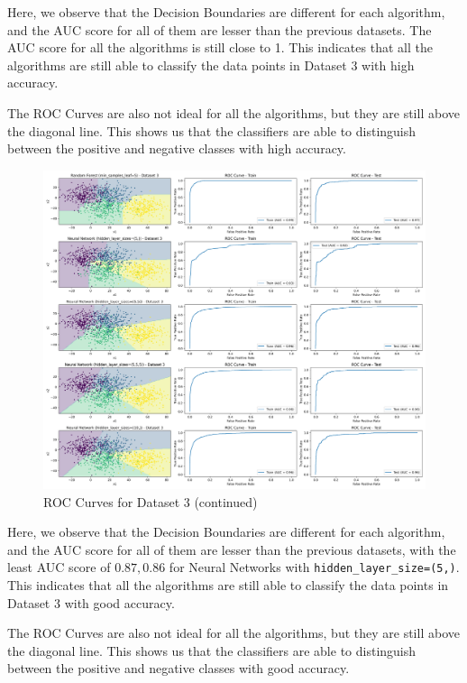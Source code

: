 Here, we observe that the Decision Boundaries are different for each algorithm, and the AUC score for all of them are lesser than the previous datasets. The AUC score for all the algorithms is still close to 1. This indicates that all the algorithms are  still able to classify the data points in Dataset 3 with high accuracy.

The ROC Curves are also not ideal for all the algorithms, but they are still above the diagonal line. This shows us that the classifiers are able to distinguish between the positive and negative classes with high accuracy.

\begin{figure}[H]
    \centering
    \includegraphics[width=\textwidth]{Images/dataset-3-roc-curves-2.png}
    \caption{ROC Curves for Dataset 3 (continued)}
\end{figure}

Here, we observe that the Decision Boundaries are different for each algorithm, and the AUC score for all of them are lesser than the previous datasets, with the least AUC score of $0.87, 0.86$ for Neural Networks with \texttt{hidden\_layer\_size=(5,)}. This indicates that all the algorithms are still able to classify the data points in Dataset 3 with good accuracy.

The ROC Curves are also not ideal for all the algorithms, but they are still above the diagonal line. This shows us that the classifiers are able to distinguish between the positive and negative classes with good accuracy.






